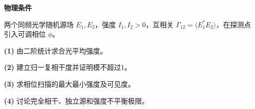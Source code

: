 \textbf{物理条件}\par 两个同频光学随机源场 \(E_1,E_2\)，强度 \(I_1,I_2>0\)，互相关 \(\Gamma_{12}=\langle E_1^*E_2\rangle\)，在探测点引入可调相位 \(\phi\)。
\par\noindent\textbf{(1)} 由二阶统计求合光平均强度。
\par\noindent\textbf{(2)} 建立归一复相干度并证明模不超过1。
\par\noindent\textbf{(3)} 求相位扫描的最大最小强度及可见度。
\par\noindent\textbf{(4)} 讨论完全相干、独立源和强度不平衡极限。
